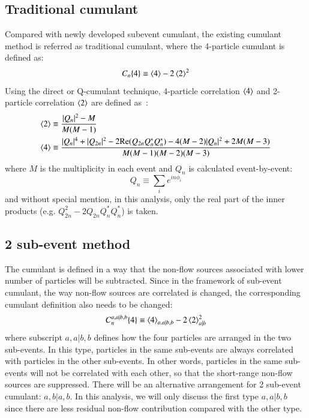 \subsection{Traditional cumulant}
Compared with newly developed subevent cumulant, the existing cumulant method is referred as traditional cumulant, where the 4-particle cumulant is defined as:
\begin{equation}
C_{n}\{4\}\equiv \left\langle 4\right\rangle-2\left\langle 2\right\rangle^{2}
\end{equation}
Using the direct or Q-cumulant technique, 4-particle correlation $\left\langle 4\right\rangle$ and 2-particle correlation $\left\langle 2\right\rangle$ are defined as~\cite{Bilandzic:2010jr, Bilandzic:2013kga}:
\begin{equation}
\begin{split}
\left\langle 2\right\rangle&\equiv \frac{|Q_{n}|^{2}-M}{M(M-1)} \\
\left\langle 4\right\rangle&\equiv \frac{|Q_{n}|^{4}+|Q_{2n}|^{2}-2\text{Re}(Q_{2n}Q_{n}^{*}Q_{n}^{*})-4(M-2)|Q_{n}|^{2}+2M(M-3)}{M(M-1)(M-2)(M-3)}
\end{split}
\end{equation}
where $M$ is the multiplicity in each event and $Q_{n}$ is calculated event-by-event:
\begin{equation}
Q_{n}\equiv\sum_{i}e^{in\phi_{i}}
\end{equation}
and without special mention, in this analysis, only the real part of the inner products (e.g. $Q_{2n}^{2}-2Q_{2n}Q_{n}^{*}Q_{n}^{*}$) is taken.



\subsection{2 sub-event method}
The cumulant is defined in a way that the non-flow sources associated with lower number of particles will be subtracted. Since in the framework of sub-event cumulant, the way non-flow sources are correlated is changed, the corresponding cumulant definition also needs to be changed:
\begin{equation}
C_{n}^{a,a|b,b}\{4\}\equiv \left\langle 4\right\rangle_{a.a|b,b}-2\left\langle 2\right\rangle_{a|b}^{2}
\end{equation}
where subscript $a,a|b,b$ defines how the four particles are arranged in the two sub-events. In this type, particles in the same sub-events are always correlated with particles in the other sub-events. In other words, particles in the same sub-events will not be correlated with each other, so that the short-range non-flow sources are suppressed. There will be an alternative arrangement for 2 sub-event cumulant: $a,b|a,b$. In this analysis, we will only discuss the first type $a,a|b,b$ since there are less residual non-flow contribution compared with the other type.


